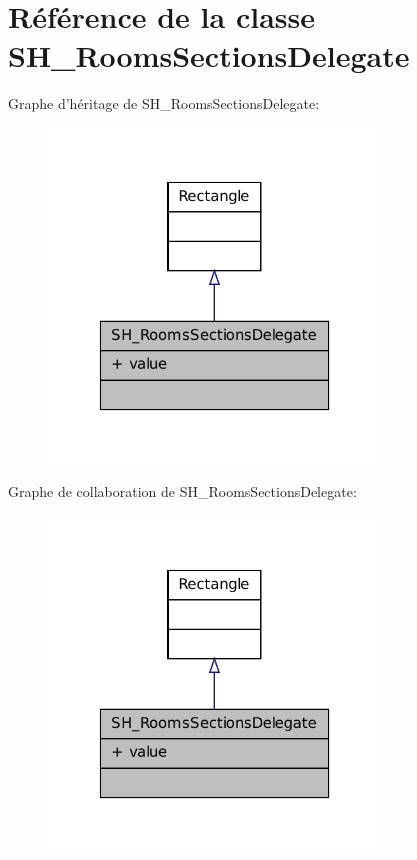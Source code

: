\hypertarget{classSH__RoomsSectionsDelegate}{\section{Référence de la classe S\-H\-\_\-\-Rooms\-Sections\-Delegate}
\label{classSH__RoomsSectionsDelegate}
}


Graphe d'héritage de S\-H\-\_\-\-Rooms\-Sections\-Delegate\-:\nopagebreak
\begin{figure}[H]
\begin{center}
\leavevmode
\includegraphics[width=250pt]{classSH__RoomsSectionsDelegate__inherit__graph}
\end{center}
\end{figure}


Graphe de collaboration de S\-H\-\_\-\-Rooms\-Sections\-Delegate\-:\nopagebreak
\begin{figure}[H]
\begin{center}
\leavevmode
\includegraphics[width=250pt]{classSH__RoomsSectionsDelegate__coll__graph}
\end{center}
\end{figure}
